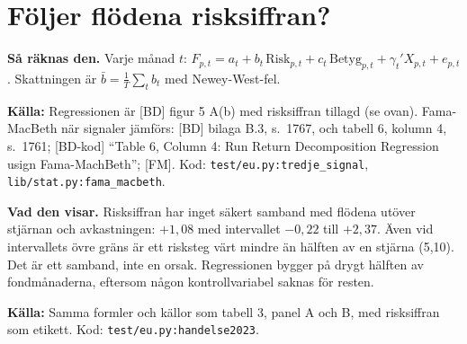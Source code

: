 \documentclass[10pt,a4paper]{article}
\newcommand{\kalla}[1]{\par\noindent\textbf{Källa:} #1\par}
\newcommand{\raknas}{\par\noindent\textbf{Så räknas den.} }
\newcommand{\visar}{\par\noindent\textbf{Vad den visar.} }
\newcommand{\kod}[1]{\texttt{#1}}
\begin{document}
\section{Följer flödena risksiffran?}
\begin{table}[H]
\caption{The risk number as a third signal. Monthly flow (percent of assets) is regressed on the displayed risk number (1 to 7), the star rating (1 to 5), the 18-month raw return, flow 19 months earlier, log size, log age, expense ratio and 60-month return volatility. Coefficients are multiplied by 12. Fama-MacBeth rows average monthly cross-sectional coefficients, with Newey-West standard errors (six lags); the pooled row has month effects and standard errors clustered by fund and month. Panel B gives the $R^2$ with all three blocks minus the $R^2$ without the block named, with month effects and indicator variables for ratings and risk numbers. European equity funds, June 2019 to December 2025.}
\centering
\end{table}
\raknas Varje månad $t$: $F_{p,t}=a_t+b_t\,\text{Risk}_{p,t}+c_t\,\text{Betyg}_{p,t}+\gamma_t'X_{p,t}+e_{p,t}$. Skattningen är $\bar b=\frac1T\sum_t b_t$ med Newey-West-fel.
\kalla{Regressionen är [BD] figur 5 A(b) med risksiffran tillagd (se ovan). Fama-MacBeth när signaler jämförs: [BD] bilaga B.3, s.~1767, och tabell 6, kolumn 4, s.~1761; [BD-kod] ``Table 6, Column 4: Run Return Decomposition Regression usign Fama-MachBeth''; [FM]. Kod: \kod{test/eu.py:tredje\_signal}, \kod{lib/stat.py:fama\_macbeth}.}
\visar Risksiffran har inget säkert samband med flödena utöver stjärnan och avkastningen: $+1{,}08$ med intervallet $-0{,}22$ till $+2{,}37$. Även vid intervallets övre gräns är ett risksteg värt mindre än hälften av en stjärna (5,10). Det är ett samband, inte en orsak. Regressionen bygger på drygt hälften av fondmånaderna, eftersom någon kontrollvariabel saknas för resten.

\begin{table}[H]
\caption{The January 2023 switch in the form of Table 4 of Ben-David et al.\ (2022). The first row gives the share of funds whose displayed risk number differs from the month before. The next rows give the $R^2$ of a regression of flow on the 18-month raw return with month-by-label effects, minus the $R^2$ with month effects only; ``beyond'' adds month-by-risk-number effects to month-by-rating effects. Before is June 2019 to December 2022, after is January 2023 to December 2025.}
\centering
\end{table}
\kalla{Samma formler och källor som tabell 3, panel A och B, med risksiffran som etikett. Kod: \kod{test/eu.py:handelse2023}.}
\end{document}
